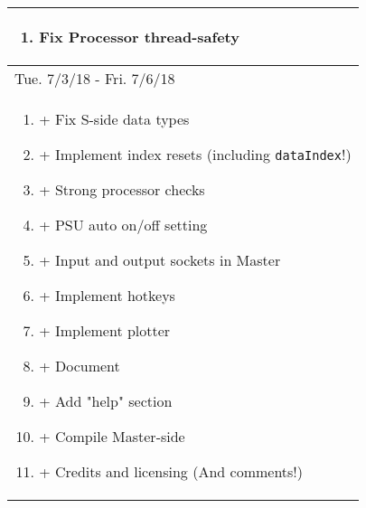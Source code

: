 \documentclass{article}
\begin{document}
\begin{center}
\begin{longtable}{| p{} |}
\begin{enumerate}
	\item Fix Processor thread-safety
\end{enumerate}\\
\hline
\multicolumn{1}{|l|}{Tue. 7/3/18 - Fri. 7/6/18}\\*
\hline
\begin{enumerate}
	\item + Fix S-side data types
	\item + Implement index resets (including \texttt{dataIndex}!)
	\item + Strong processor checks
	\item + PSU auto on/off setting
	\item + Input and output sockets in Master
	\item + Implement hotkeys
	\item + Implement plotter
	\item + Document
	\item + Add "help" section
	\item + Compile Master-side
	\item + Credits and licensing (And comments!)
\end{enumerate}\\

\hline
\end{longtable}
\end{center}
\end{document}
